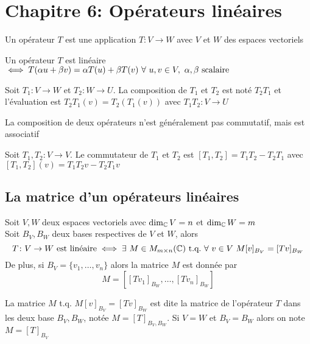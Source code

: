 \section{Chapitre 6: Opérateurs linéaires}
\begin{definition}
    Un opérateur $T$ est une application $T\colon V \to W$ avec $V$ et $W$ des espaces vectoriels
\end{definition}
\begin{definition}
    Un opérateur $T$ est linéaire $\iff T(\alpha u + \beta v) = \alpha T(u) + \beta T(v) \ \forall \ u, v \in V, \ \alpha, \beta \text{ scalaire}$ 
\end{definition}
\begin{definition}
    Soit $T_1 \colon V \to W$ et $T_2 \colon W \to U$. La composition de $T_1$ et $T_2$ est noté
    $T_2 T_1$ et l'évaluation est $T_2 T_1 (v) = T_2(T_1(v))$ avec $T_1 T_2 \colon V \to U$
\end{definition}
\begin{remark}
    La composition de deux opérateurs n'est généralement pas commutatif, mais est associatif
\end{remark}
\begin{definition}
    Soit $T_1, T_2 \colon V \to V$. Le commutateur de $T_1$ et $T_2$ est 
    $[T_1, T_2] = T_1T_2 - T_2T_1$ avec $[T_1, T_2](v) = T_1T_2v - T_2T_1v$
\end{definition}

\subsection{La matrice d'un opérateurs linéaires}
\begin{theorem}
    Soit $V, W$ deux espaces vectoriels avec $\dim_{\mathbb{C}} V = n$ et $\dim_{\mathbb{C}} W = m$ \\
    Soit $B_V, B_W$ deux bases respectives de $V$ et $W$, alors 
    \[
    T\colon V \to W \ \text{est linéaire} \iff \exists \ M \in M_{m \times n}(\C) \ \text{t.q.} \ 
    \forall \ v \in V \ M[v]_{B_V} = [Tv]_{B_W}
    \]  
    De plus, si $B_V = \{v_1, \dots, v_n\}$ alors la matrice $M$ est donnée par 
    \[
    M = \left[ \left[ Tv_1 \right]_{B_W}, \dots, \left[ Tv_n \right]_{B_W} \right]
    \]
\end{theorem}
\begin{definition}
    La matrice $M$ t.q. $M[v]_{B_V} = [Tv]_{B_W}$ est dite la matrice de l'opérateur $T$
    dans les deux base $B_V, B_W$, notée $M = [T]_{B_V, B_W}$. Si $V = W$ et $B_V = B_W$
    alors on note $M = [T]_{B_V}$
\end{definition}

